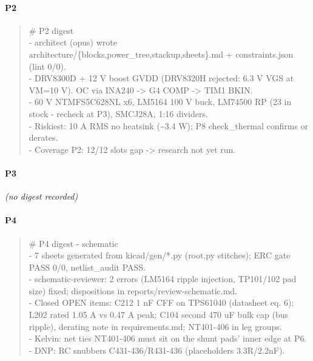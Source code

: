 \documentclass[11pt,a4paper]{article}
\begin{document}
\paragraph*{P2}
\begin{quote}\small\ttfamily\raggedright
\# P2 digest\\
- architect (opus) wrote architecture/\{blocks,power\_tree,stackup,sheets\}.md + constraints.json (lint 0/0).\\
- DRV8300D + 12 V boost GVDD (DRV8320H rejected: 6.3 V VGS at VM=10 V). OC via INA240 -\textgreater{} G4 COMP -\textgreater{} TIM1 BKIN.\\
- 60 V NTMFS5C628NL x6, LM5164 100 V buck, LM74500 RP (23 in stock - recheck at P3), SMCJ28A, 1:16 dividers.\\
- Riskiest: 10 A RMS no heatsink (\textasciitilde{}3.4 W); P8 check\_thermal confirms or derates.\\
- Coverage P2: 12/12 slots gap -\textgreater{} research not yet run.
\end{quote}
\paragraph*{P3}
\emph{(no digest recorded)}
\paragraph*{P4}
\begin{quote}\small\ttfamily\raggedright
\# P4 digest - schematic\\
- 7 sheets generated from kicad/gen/{*}.py (root.py stitches); ERC gate PASS 0/0, netlist\_audit PASS.\\
- schematic-reviewer: 2 errors (LM5164 ripple injection, TP101/102 pad size) fixed; dispositions in reports/review-schematic.md.\\
- Closed OPEN items: C212 1 nF CFF on TPS61040 (datasheet eq. 6); L202 rated 1.05 A vs 0.47 A peak; C104 second 470 uF bulk cap (bus ripple), derating note in requirements.md; NT401-406 in leg groups.\\
- Kelvin: net ties NT401-406 must sit on the shunt pads' inner edge at P6.\\
- DNP: RC snubbers C431-436/R431-436 (placeholders 3.3R/2.2nF).
\end{quote}
\end{document}
